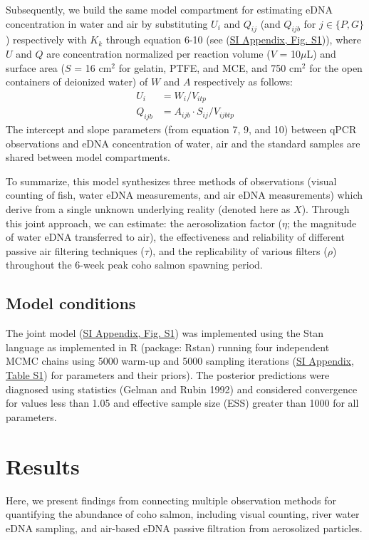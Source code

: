 \documentclass{article}
\begin{document}
Subsequently, we build the same model compartment for estimating eDNA concentration in water and air by substituting $U_i$ and $Q_{ij}$ (and $Q_{ijb}$ for $j \in \{P,G\}$) respectively with $K_k$ through equation 6-10 (see (\href{SI_Appendix.pdf}{SI Appendix, Fig. S1})), where $U$ and $Q$ are concentration normalized per reaction volume ($V$ = 10$\mu$L) and surface area ($S$ = 16 cm$^2$ for gelatin, PTFE, and MCE, and 750 cm$^2$ for the open containers of deionized water) of $W$ and $A$ respectively as follows:
\begin{align}
    U_i & = W_i / V_{itp}\\
    Q_{ijb} & = A_{ijb} \cdot S_{ij} / V_{ijbtp}
\end{align}
The intercept and slope parameters (from equation 7, 9, and 10) between qPCR observations and eDNA concentration of water, air and the standard samples are shared between model compartments.


To summarize, this model synthesizes three methods of observations (visual counting of fish, water eDNA measurements, and air eDNA measurements) which derive from a single unknown underlying reality (denoted here as $X$). Through this joint approach, we can estimate: the aerosolization factor ($\eta$; the magnitude of water eDNA transferred to air), the effectiveness and reliability of different passive air filtering techniques ($\tau$), and the replicability of various filters ($\rho$) throughout the 6-week peak coho salmon spawning period.

\subsection{Model conditions}

The joint model (\href{SI_Appendix.pdf}{SI Appendix, Fig. S1}) was implemented using the Stan language as implemented in R (package: Rstan) running four independent MCMC chains using 5000 warm-up and 5000 sampling iterations (\href{SI_Appendix.pdf}{SI Appendix, Table S1}) for parameters and their priors). The posterior predictions were diagnosed using statistics (Gelman and Rubin 1992) and considered convergence for values less than 1.05 and effective sample size (ESS) greater than 1000 for all parameters.

\section{Results}
Here, we present findings from connecting multiple observation methods for quantifying the abundance of coho salmon, including visual counting, river water eDNA sampling, and air-based eDNA passive filtration from aerosolized particles.
\end{document}

